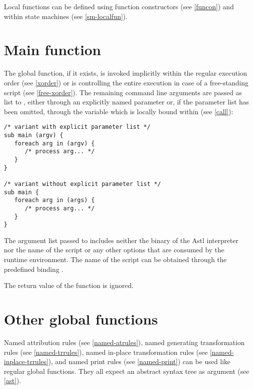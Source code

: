 Local functions can be defined using function
constructors (see \ref{funcon}) and within state machines (see
\ref{sm-localfun}).

\section{Main function}\label{main}

The global  function, if it exists, is invoked implicitly
within the regular execution order (see \ref{xorder}) or is controlling
the entire execution in case of a free-standing script
(see \ref{free-xorder}). The remaining
command line arguments are passed as list
to , either through an explicitly named parameter
or, if the parameter list has been omitted, through the variable
 which is locally bound within 
(see \ref{call}):

\begin{lstlisting}
/* variant with explicit parameter list */
sub main (argv) {
   foreach arg in (argv) {
      /* process arg... */
   }
}

/* variant without explicit parameter list */
sub main {
   foreach arg in (args) {
      /* process arg... */
   }
}
\end{lstlisting}

\noindent
The argument list passed to  includes neither the
binary of the Astl interpreter nor the name of the script or
any other options that are consumed by the runtime environment. The
name of the script can be obtained through the predefined binding
.

The return value of the  function is ignored.

\section{Other global functions}

Named attribution rules (see \ref{named-atrules}),
named generating transformation rules (see \ref{named-trrules}),
named in-place transformation rules (see \ref{named-inplace-trrules}),
and named print rules (see \ref{named-print}) can be
used like regular global functions. They all expect an
abstract syntax tree as argument (see \ref{ast}).

\endinput
